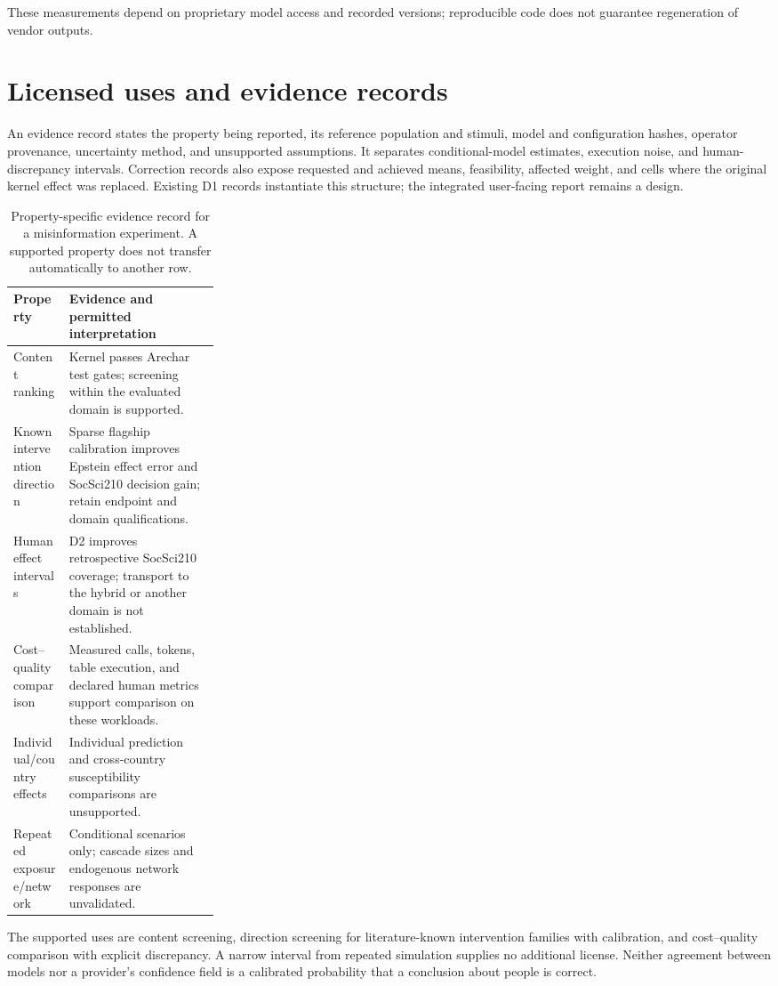 \documentclass[11pt]{article}
\begin{document}
These measurements depend on proprietary model access and recorded versions; reproducible code does not guarantee regeneration of vendor outputs.

\section{Licensed uses and evidence records}
An evidence record states the property being reported, its reference population and stimuli, model and configuration hashes, operator provenance, uncertainty method, and unsupported assumptions. It separates conditional-model estimates, execution noise, and human-discrepancy intervals. Correction records also expose requested and achieved means, feasibility, affected weight, and cells where the original kernel effect was replaced. Existing D1 records instantiate this structure; the integrated user-facing report remains a design.

\begin{table}[tp]
\centering\small
\caption{Property-specific evidence record for a misinformation experiment. A supported property does not transfer automatically to another row.}
\label{tab:evidence}
\begin{tabularx}{\linewidth}{@{}p{0.27\linewidth}X@{}}
\toprule
Property & Evidence and permitted interpretation\\
\midrule
Content ranking & Kernel passes Arechar test gates; screening within the evaluated domain is supported.\\
Known intervention direction & Sparse flagship calibration improves Epstein effect error and SocSci210 decision gain; retain endpoint and domain qualifications.\\
Human effect intervals & D2 improves retrospective SocSci210 coverage; transport to the hybrid or another domain is not established.\\
Cost--quality comparison & Measured calls, tokens, table execution, and declared human metrics support comparison on these workloads.\\
Individual/country effects & Individual prediction and cross-country susceptibility comparisons are unsupported.\\
Repeated exposure/network & Conditional scenarios only; cascade sizes and endogenous network responses are unvalidated.\\
\bottomrule
\end{tabularx}
\end{table}

The supported uses are content screening, direction screening for literature-known intervention families with calibration, and cost--quality comparison with explicit discrepancy. A narrow interval from repeated simulation supplies no additional license. Neither agreement between models nor a provider's confidence field is a calibrated probability that a conclusion about people is correct.
\end{document}
